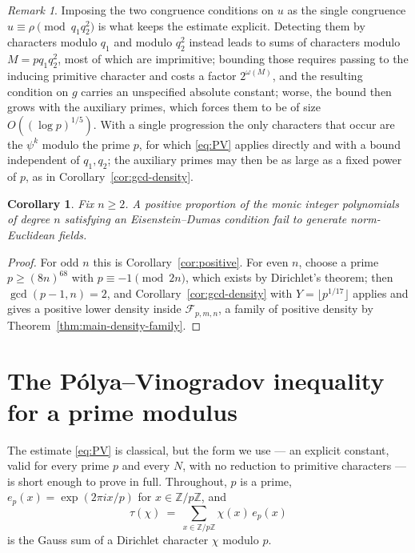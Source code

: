 \documentclass[11pt,reqno]{amsart}
\theoremstyle{plain}
\newtheorem{corollary}[theorem]{Corollary}
\theoremstyle{definition}
\theoremstyle{remark}
\newtheorem{remark}[theorem]{Remark}
\newcommand{\Z}{\mathbb{Z}}
\begin{document}
\begin{remark}
Imposing the two congruence conditions on $u$ as the single congruence $u\equiv\rho\pmod{q_1q_2^2}$
is what keeps the estimate explicit. Detecting them by characters modulo $q_1$ and modulo $q_2^2$
instead leads to sums of characters modulo $M=pq_1q_2^{2}$, most of which are imprimitive; bounding
those requires passing to the inducing primitive character and costs a factor $2^{\omega(M)}$, and
the resulting condition on $g$ carries an unspecified absolute constant; worse, the bound then
grows with the auxiliary primes, which forces them to be of size $O((\log p)^{1/5})$. With a
single progression the only characters that occur are the $\psi^{k}$ modulo the prime $p$, for
which \eqref{eq:PV} applies directly and with a bound independent of $q_1,q_2$; the auxiliary
primes may then be as large as a fixed power of $p$, as in Corollary~\ref{cor:gcd-density}.
\end{remark}

\begin{corollary}
Fix $n\ge2$. A positive proportion of the monic integer polynomials of degree $n$ satisfying an
Eisenstein--Dumas condition fail to generate norm-Euclidean fields.
\end{corollary}

\begin{proof}
For odd $n$ this is Corollary~\ref{cor:positive}. For even $n$, choose a prime
$p\ge(8n)^{68}$ with $p\equiv-1\pmod{2n}$, which exists by Dirichlet's theorem; then
$\gcd(p-1,n)=2$, and Corollary~\ref{cor:gcd-density} with $Y=\lfloor p^{1/17}\rfloor$ applies and
gives a positive lower density inside $\mathcal F_{p,m,n}$, a family of positive density by
Theorem~\ref{thm:main-density-family}.
\end{proof}

\appendix

\section{The Pólya--Vinogradov inequality for a prime modulus}\label{app:pv}

The estimate \eqref{eq:PV} is classical, but the form we use --- an explicit constant, valid for
every prime $p$ and every $N$, with no reduction to primitive characters --- is short enough to
prove in full. Throughout, $p$ is a prime, $e_p(x)=\exp(2\pi i x/p)$ for $x\in\Z/p\Z$, and
\[
  \tau(\chi)\ =\ \sum_{x\in\Z/p\Z}\chi(x)\,e_p(x)
\]
is the Gauss sum of a Dirichlet character $\chi$ modulo $p$.
\end{document}
